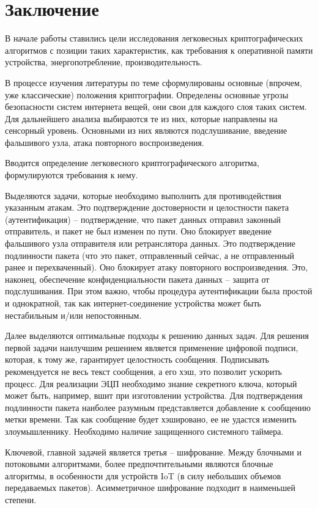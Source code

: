 \chapter*{Заключение} \label{ch-conclusion}

В начале работы ставились цели исследования легковесных криптографических алгоритмов с позиции таких характеристик, как требования к оперативной памяти устройства, энергопотребление, производительность.

В процессе изучения литературы по теме сформулированы основные (впрочем, уже классические) положения криптографии. Определены основные угрозы безопасности систем интернета вещей, они свои для каждого слоя таких систем. Для дальнейшего анализа выбираются те из них, которые направлены на сенсорный уровень. Основными из них являются подслушивание, введение фальшивого узла, атака повторного воспроизведения.

Вводится определение легковесного криптографического алгоритма, формулируются требования к нему.

Выделяются задачи, которые необходимо выполнить для противодействия указанным атакам. Это подтверждение достоверности и целостности пакета (аутентификация) – подтверждение, что пакет данных отправил законный отправитель, и пакет не был изменен по пути. Оно блокирует введение фальшивого узла отправителя или ретранслятора данных. Это подтверждение подлинности пакета (что это пакет, отправленный сейчас, а не отправленный ранее и перехваченный). Оно блокирует атаку повторного воспроизведения. Это, наконец, обеспечение конфиденциальности пакета данных – защита от подслушивания. При этом важно, чтобы процедура аутентификации была простой и однократной, так как интернет-соединение устройства может быть нестабильным и/или непостоянным.

Далее выделяются оптимальные подходы к решению данных задач. Для решения первой задачи наилучшим решением является применение цифровой подписи, которая, к тому же, гарантирует целостность сообщения. Подписывать рекомендуется не весь текст сообщения, а его хэш, это позволит ускорить процесс. Для реализации ЭЦП необходимо знание секретного ключа, который может быть, например, вшит при изготовлении устройства. Для подтверждения подлинности пакета наиболее разумным представляется добавление к сообщению метки времени. Так как сообщение будет хэшировано, ее не удастся изменить злоумышленнику. Необходимо наличие защищенного системного таймера.

Ключевой, главной задачей является третья – шифрование. Между блочными и потоковыми алгоритмами, более предпочтительными являются блочные алгоритмы, в особенности для устройств IoT (в силу небольших объемов передаваемых пакетов). Асимметричное шифрование подходит в наименьшей степени.

